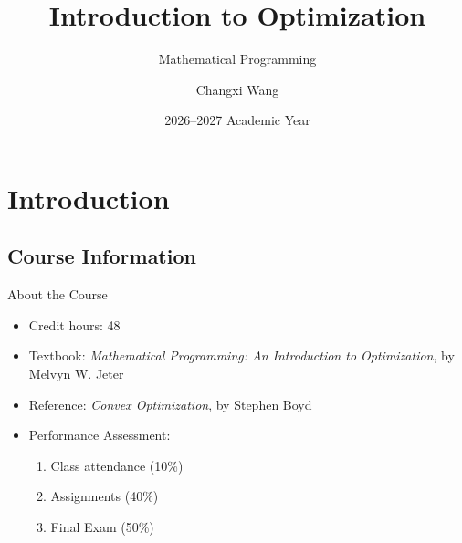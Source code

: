 \documentclass[aspectratio=169,hyperref,UTF8,CJK]{beamer}
\title[Introduction to Optimization]{Introduction to Optimization}
\subtitle{Mathematical Programming}
\author[Changxi Wang]{Changxi Wang}
\institute{Sichuan University-Pittsburgh Institute\\Chengdu, China}
\date{2026--2027 Academic Year}
\begin{document}

\section{Introduction}
\subsection{Course Information}

\begin{frame}{About the Course}
  \begin{itemize}
    \item Credit hours: 48
    \item Textbook: \emph{Mathematical Programming: An Introduction to Optimization}, by Melvyn W. Jeter
    \item Reference: \emph{Convex Optimization}, by Stephen Boyd
    \item Performance Assessment:
      \begin{enumerate}
        \item Class attendance (10\%)
        \item Assignments (40\%)
        \item Final Exam (50\%)
      \end{enumerate}
  \end{itemize}
\end{frame}
\end{document}
